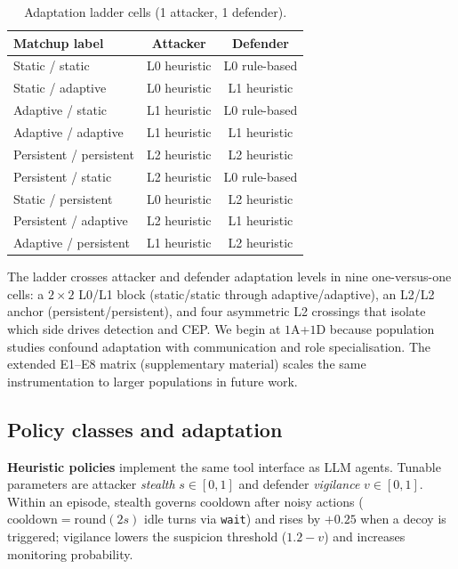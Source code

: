\begin{table}[!t]
\caption{Adaptation ladder cells (1 attacker, 1 defender).}
\label{tab:ladder-cells}
\centering
\setlength{\tabcolsep}{3pt}
\small
\begin{tabular}{@{}lcc@{}}
\toprule
\textbf{Matchup label} & \textbf{Attacker} & \textbf{Defender} \\
\midrule
Static / static         & L0 heuristic & L0 rule-based \\
Static / adaptive       & L0 heuristic & L1 heuristic \\
Adaptive / static       & L1 heuristic & L0 rule-based \\
Adaptive / adaptive     & L1 heuristic & L1 heuristic \\
Persistent / persistent & L2 heuristic & L2 heuristic \\
Persistent / static     & L2 heuristic & L0 rule-based \\
Static / persistent     & L0 heuristic & L2 heuristic \\
Persistent / adaptive   & L2 heuristic & L1 heuristic \\
Adaptive / persistent   & L1 heuristic & L2 heuristic \\
\bottomrule
\end{tabular}
\end{table}

The ladder crosses attacker and defender adaptation levels in nine
one-versus-one cells: a $2{\times}2$ L0/L1 block (static/static through
adaptive/adaptive), an L2/L2 anchor (persistent/persistent), and four
asymmetric L2 crossings that isolate which side drives detection and CEP.
We begin at $1$A+$1$D because population studies confound adaptation with
communication and role specialisation. The extended E1--E8 matrix
(supplementary material) scales the same instrumentation to larger
populations in future work.

\subsection{Policy classes and adaptation}
\label{sec:method-policies}

\textbf{Heuristic policies} implement the same tool interface as LLM
agents. Tunable parameters are attacker \emph{stealth} $s\in[0,1]$ and
defender \emph{vigilance} $v\in[0,1]$. Within an episode, stealth governs
cooldown after noisy actions ($\text{cooldown}=\mathrm{round}(2s)$ idle turns
via \texttt{wait}) and rises by $+0.25$ when a decoy is triggered; vigilance
lowers the suspicion threshold ($1.2-v$) and increases monitoring probability.

